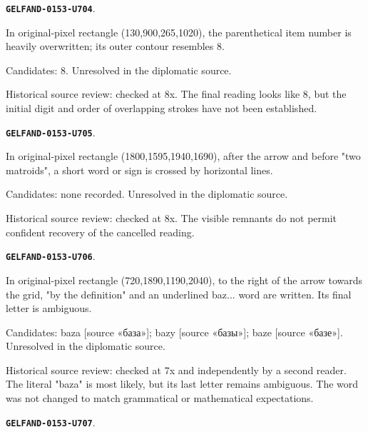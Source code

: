 \documentclass[11pt]{article}
\theoremstyle{definition}
\theoremstyle{remark}
\begin{document}
\par\noindent\leavevmode{}\label{GELFAND-0153-U704}\label{GELFAND-P001412:overwritten-eight:note}\textbf{\texttt{GELFAND-0153-U704}}.\nopagebreak[4]\par
In original-pixel rectangle (130,900,265,1020), the parenthetical item number is heavily overwritten; its outer contour resembles 8.\par
Candidates: 8. Unresolved in the diplomatic source.\par
Historical source review: checked at 8x. The final reading looks like 8, but the initial digit and order of overlapping strokes have not been established.\par\medskip
\par\noindent\leavevmode{}\label{GELFAND-0153-U705}\label{GELFAND-P001412:problem-eleven-cancelled:note}\textbf{\texttt{GELFAND-0153-U705}}.\nopagebreak[4]\par
In original-pixel rectangle (1800,1595,1940,1690), after the arrow and before "two matroids", a short word or sign is crossed by horizontal lines.\par
Candidates: none recorded. Unresolved in the diplomatic source.\par
Historical source review: checked at 8x. The visible remnants do not permit confident recovery of the cancelled reading.\par\medskip
\par\noindent\leavevmode{}\label{GELFAND-0153-U706}\label{GELFAND-P001412:basis-construction-word:note}\textbf{\texttt{GELFAND-0153-U706}}.\nopagebreak[4]\par
In original-pixel rectangle (720,1890,1190,2040), to the right of the arrow towards the grid, "by the definition" and an underlined baz... word are written. Its final letter is ambiguous.\par
Candidates: baza [source «база»]; bazy [source «базы»]; baze [source «базе»]. Unresolved in the diplomatic source.\par
Historical source review: checked at 7x and independently by a second reader. The literal "baza" is most likely, but its last letter remains ambiguous. The word was not changed to match grammatical or mathematical expectations.\par\medskip
\par\noindent\leavevmode{}\label{GELFAND-0153-U707}\label{GELFAND-P001412:basis-grid:note}\textbf{\texttt{GELFAND-0153-U707}}.\nopagebreak[4]\par
\end{document}
